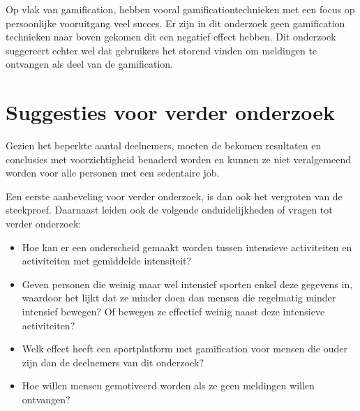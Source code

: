 Op vlak van gamification, hebben vooral gamificationtechnieken met een focus op persoonlijke vooruitgang veel succes. Er zijn in dit onderzoek geen gamification technieken naar boven gekomen dit een negatief effect hebben. Dit onderzoek suggereert echter wel dat gebruikers het storend vinden om meldingen te ontvangen als deel van de gamification.

\section{Suggesties voor verder onderzoek}

Gezien het beperkte aantal deelnemers, moeten de bekomen resultaten en conclusies met voorzichtigheid benaderd worden en kunnen ze niet veralgemeend worden voor alle personen met een sedentaire job.

Een eerste aanbeveling voor verder onderzoek, is dan ook het vergroten van de steekproef. Daarnaast leiden ook de volgende onduidelijkheden of vragen tot verder onderzoek:

\begin{itemize}
    \item Hoe kan er een onderscheid gemaakt worden tussen intensieve activiteiten en activiteiten met gemiddelde intensiteit?
    \item Geven personen die weinig maar wel intensief sporten enkel deze gegevens in, waardoor het lijkt dat ze minder doen dan mensen die regelmatig minder intensief bewegen? Of bewegen ze effectief weinig naast deze intensieve activiteiten?
    \item Welk effect heeft een sportplatform met gamification voor mensen die ouder zijn dan de deelnemers van dit onderzoek?
    \item Hoe willen mensen gemotiveerd worden als ze geen meldingen willen ontvangen?
\end{itemize}